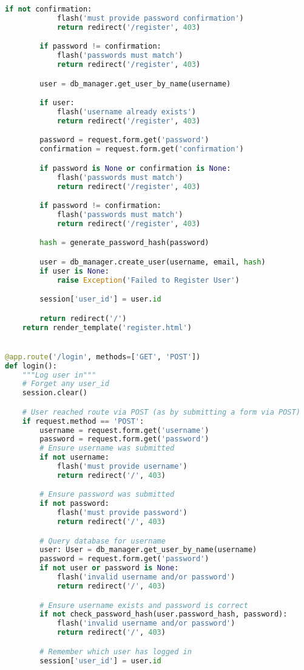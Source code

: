 \begin{lstlisting}[language=Python]
		if not confirmation:
			flash('must provide password confirmation')
			return redirect('/register', 403)

		if password != confirmation:
			flash('passwords must match')
			return redirect('/register', 403)

		user = db_manager.get_user_by_name(username)

		if user:
			flash('username already exists')
			return redirect('/register', 403)

		password = request.form.get('password')
		confirmation = request.form.get('confirmation')

		if password is None or confirmation is None:
			flash('passwords must match')
			return redirect('/register', 403)

		if password != confirmation:
			flash('passwords must match')
			return redirect('/register', 403)

		hash = generate_password_hash(password)

		user = db_manager.create_user(username, email, hash)
		if user is None:
			raise Exception('Failed to Register User')

		session['user_id'] = user.id

		return redirect('/')
	return render_template('register.html')


@app.route('/login', methods=['GET', 'POST'])
def login():
	"""Log user in"""
	# Forget any user_id
	session.clear()

	# User reached route via POST (as by submitting a form via POST)
	if request.method == 'POST':
		username = request.form.get('username')
		password = request.form.get('password')
		# Ensure username was submitted
		if not username:
			flash('must provide username')
			return redirect('/', 403)

		# Ensure password was submitted
		if not password:
			flash('must provide password')
			return redirect('/', 403)

		# Query database for username
		user: User = db_manager.get_user_by_name(username)
		password = request.form.get('password')
		if not user or password is None:
			flash('invalid username and/or password')
			return redirect('/', 403)

		# Ensure username exists and password is correct
		if not check_password_hash(user.password_hash, password):
			flash('invalid username and/or password')
			return redirect('/', 403)

		# Remember which user has logged in
		session['user_id'] = user.id


\end{lstlisting}
